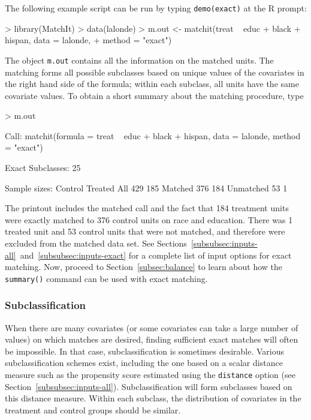 \documentclass[oneside,letterpaper,titlepage]{article}
\begin{document}
The following example script can be run by typing {\tt demo(exact)} at
the R prompt:
\begin{Schunk}
\begin{Sinput}
> library(MatchIt)
> data(lalonde)
> m.out <- matchit(treat ~ educ + black + hispan, data = lalonde, 
+     method = "exact")
\end{Sinput}
\end{Schunk}
The object \texttt{m.out} contains all the information on the matched
units.  The matching forms all possible subclasses based on unique
values of the covariates in the right hand side of the formula; within
each subclass, all units have the same covariate values.  To obtain
a short summary about the matching procedure, type
\begin{Schunk}
\begin{Sinput}
> m.out
\end{Sinput}
\begin{Soutput}
Call: 
matchit(formula = treat ~ educ + black + hispan, data = lalonde, 
    method = "exact")

Exact Subclasses: 25

Sample sizes:
          Control Treated
All           429     185
Matched       376     184
Unmatched      53       1
\end{Soutput}
\end{Schunk}
The printout includes the matched call and the fact that
184 treatment units were
exactly matched to 376
control units on race and education. There was
1 treated unit and
53 control units that were
not matched, and therefore were excluded from the matched data set.
See
Sections~\ref{subsubsec:inputs-all}~and~\ref{subsubsec:inputs-exact}
for a complete list of input options for exact matching.  Now, proceed
to Section~\ref{subsec:balance} to learn about how the {\tt summary()}
command can be used with exact matching.

\subsubsection{Subclassification}
\label{subsubsec:subclass}

When there are many covariates (or some covariates can take a large
number of values) on which matches are desired, finding sufficient
exact matches will often be impossible.  In that case,
subclassification is sometimes desirable. Various subclassification
schemes exist, including the one based on a scalar distance measure
such as the propensity score estimated using the \texttt{distance}
option (see Section~\ref{subsubsec:inputs-all}).  Subclassification
will form subclasses based on this distance measure.  Within each
subclass, the distribution of covariates in the treatment and control
groups should be similar.
\end{document}
